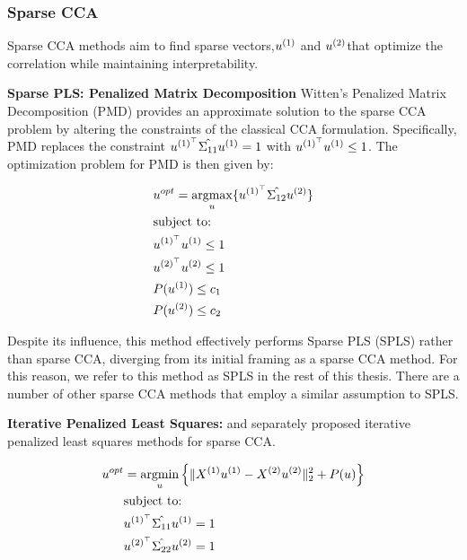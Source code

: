 \subsubsection{Sparse CCA}

Sparse CCA methods aim to find sparse vectors,\(u^{(1)}\) and \(u^{(2)}\)that optimize the correlation while
maintaining interpretability.

\textbf{Sparse PLS: Penalized Matrix Decomposition}
Witten's Penalized Matrix Decomposition (PMD) \cite{witten2009penalized} provides an approximate solution to the sparse CCA problem by altering the constraints of the classical CCA formulation.
Specifically, PMD replaces the constraint \(u^{(1)^{\top}} \hat{\Sigma_{11}} u^{(1)} = 1\) with \(u^{(1)^{\top}} u^{(1)} \leq 1\).
The optimization problem for PMD is then given by:

\begin{align}
    & u^{opt}=\underset{u}{\mathrm{argmax}}\{ u^{(1)^{\top}} \hat{\Sigma_{12}} u^{(2)} \} \\
    & \text{subject to:} \notag \\
    & u^{(1)^{\top}} u^{(1)} \leq 1 \notag \\
    & u^{(2)^{\top}} u^{(2)} \leq 1 \notag \\
    & P(u^{(1)}) \leq c_1 \notag \\
    & P(u^{(2)}) \leq c_2 \notag
\end{align}

Despite its influence, this method effectively performs Sparse PLS (SPLS) rather than sparse CCA, diverging from its
initial framing as a sparse CCA method. For this reason, we refer to this method as SPLS in the rest of this thesis.
There are a number of other sparse CCA methods that employ a similar assumption to SPLS\cite{parkhomenko2009sparse}.

\textbf{Iterative Penalized Least Squares:} \cite{wilms2015sparse} and \cite{mai2019iterative} separately proposed iterative penalized least squares methods for sparse CCA.

\begin{align}
    \label{eq:mai}
    u^{opt} &= \underset{u}{\mathrm{argmin}} \left\{ \|X^{(1)}u^{(1)} - X^{(2)}u^{(2)}\|_2^2 + P(u) \right\} \\
    &\text{subject to:} \notag \\
    &u^{(1)^{\top}} \hat{\Sigma_{11}} u^{(1)}=1 \notag \\
    &u^{(2)^{\top}} \hat{\Sigma_{22}} u^{(2)}=1 \notag
\end{align}

